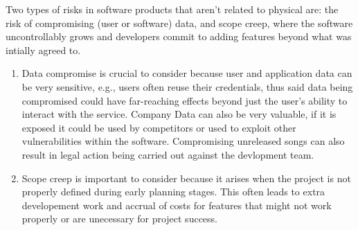 \documentclass{article}
\begin{document}
\begin{enumerate}
    Two types of risks in software products that aren't related to physical are: the risk of compromising (user or software) data, and scope creep, where the software uncontrollably grows and developers commit to adding features beyond what was intially agreed to.
    \begin{enumerate}
        \item Data compromise is crucial to consider because user and application data can be very sensitive, e.g., users often reuse their credentials, thus said data being compromised could have far-reaching effects beyond just the user's ability to interact with the service. Company Data can also be very valuable, if it is exposed it could be used by competitors or used to exploit other vulnerabilities within the software. Compromising unreleased songs can also result in legal action being carried out against the devlopment team.
        \item Scope creep is important to consider because it arises when the project is not properly  defined during early planning stages. This often leads to extra developement work and accrual of costs for features that might not work properly or are unecessary for project success.
    \end{enumerate}
\end{enumerate}
\end{document}
